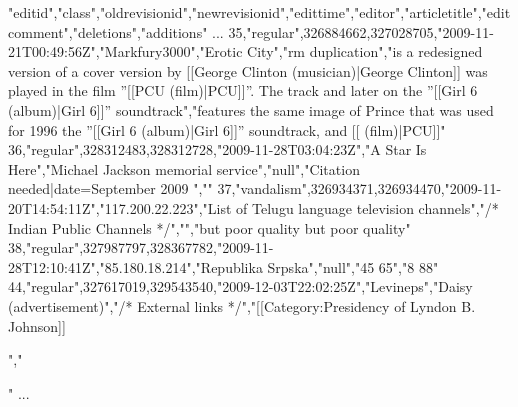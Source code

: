 "editid","class","oldrevisionid","newrevisionid","edittime","editor","articletitle","editcomment","deletions","additions"
...
35,"regular",326884662,327028705,"2009-11-21T00:49:56Z","Markfury3000","Erotic City","rm duplication","is a redesigned version of  a cover version by [[George Clinton (musician)|George Clinton]] was played in the film ''[[PCU (film)|PCU]]''. The track   and later on the ''[[Girl 6 (album)|Girl 6]]'' soundtrack","features the same image of Prince that was used for 1996  the ''[[Girl 6 (album)|Girl 6]]'' soundtrack, and  [[  (film)|PCU]]"
36,"regular",328312483,328312728,"2009-11-28T03:04:23Z","A Star Is Here","Michael Jackson memorial service","null","{{Citation needed|date=September 2009}} ",""
37,"vandalism",326934371,326934470,"2009-11-20T14:54:11Z","117.200.22.223","List of Telugu language television channels","/* Indian Public Channels */","","but poor quality but poor quality"
38,"regular",327987797,328367782,"2009-11-28T12:10:41Z","85.180.18.214","Republika Srpska","null","45 65","8 88"
44,"regular",327617019,329543540,"2009-12-03T22:02:25Z","Levineps","Daisy (advertisement)","/* External links */","[[Category:Presidency of Lyndon B. Johnson]]

 

","

"
...
